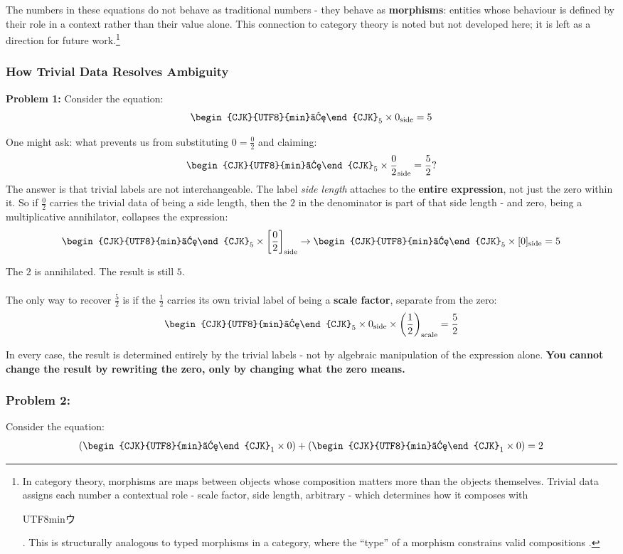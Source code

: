 \documentclass{article}
\newcommand{\U}{\begin{CJK}{UTF8}{min}ウ\end{CJK}}
\begin{document}
The numbers in these equations do not behave as traditional numbers - 
they behave as \textbf{morphisms}: entities whose behaviour is defined 
by their role in a context rather than their value alone. This connection 
to category theory is noted but not developed here; it is left as a 
direction for future work.\footnote{In category theory, morphisms are 
maps between objects whose composition matters more than the objects 
themselves. Trivial data assigns each number a contextual role - scale 
factor, side length, arbitrary - which determines how it composes with 
\U. This is structurally analogous to typed morphisms in a category, 
where the ``type'' of a morphism constrains valid compositions \cite{awodey2010category}.} 

\subsubsection{How Trivial Data Resolves Ambiguity}

\textbf{Problem 1:}
Consider the equation:
$$\text{\U}_5 \times 0_{\text{side}} = 5$$

One might ask: what prevents us from substituting $0 = \frac{0}{2}$ and 
claiming:
$$\text{\U}_5 \times \frac{0}{2}_{\text{side}} = \frac{5}{2}?$$The answer is that trivial labels are not interchangeable. The label 
\textit{side length} attaches to the \textbf{entire expression}, not just 
the zero within it. So if $\frac{0}{2}$ carries the trivial data of being 
a side length, then the $2$ in the denominator is part of that side length 
- and zero, being a multiplicative annihilator, collapses the expression:
$$\text{\U}_5 \times \left[\frac{0}{2}\right]_{\text{side}} \to 
\text{\U}_5 \times [0]_{\text{side}} = 5$$

The $2$ is annihilated. The result is still $5$.\\\\
The only way to recover $\frac{5}{2}$ is if the $\frac{1}{2}$ carries its 
own trivial label of being a \textbf{scale factor}, separate from the zero:
$$\text{\U}_5 \times 0_{\text{side}} \times \left(\frac{1}{2}\right)_{\text{scale}} = \frac{5}{2}$$

In every case, the result is determined 
entirely by the trivial labels - not by algebraic manipulation of the 
expression alone. \textbf{You cannot change the result by rewriting the 
zero, only by changing what the zero means.}

\subsubsection*{Problem 2:} Consider the equation:
$$\left(\text{\U}_1 \times 0\right) + \left(\text{\U}_1 \times 0\right) = 2$$
\end{document}
